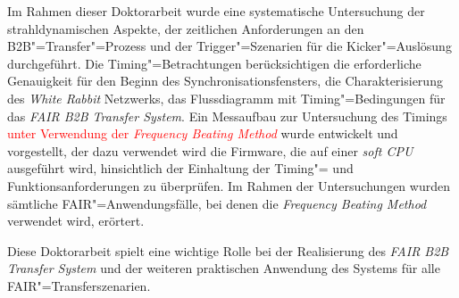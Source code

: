 Im Rahmen dieser Doktorarbeit wurde eine systematische Untersuchung der strahldynamischen Aspekte, der zeitlichen Anforderungen an den B2B"=Transfer"=Prozess und der Trigger"=Szenarien f\"ur die Kicker"=Ausl\"osung durchgef\"uhrt. Die Timing"=Betrachtungen ber\"ucksichtigen die erforderliche Genauigkeit f\"ur den Beginn des Synchronisationsfensters, die Charakterisierung des \textit{White Rabbit} Netzwerks, das Flussdiagramm mit Timing"=Bedingungen f\"ur das \textit{FAIR B2B Transfer System}. Ein Messaufbau zur Untersuchung des Timings \textcolor{red}{unter Verwendung der \textit{Frequency Beating Method}} wurde entwickelt und vorgestellt, der dazu verwendet wird die Firmware, die auf einer \textit{soft CPU} ausgef\"uhrt wird, hinsichtlich der Einhaltung der Timing"= und Funktionsanforderungen zu \"uberpr\"ufen. Im Rahmen der Untersuchungen wurden s\"amtliche FAIR"=Anwendungsf\"alle, bei denen die \textit{Frequency Beating Method} verwendet wird, er\"ortert.

Diese Doktorarbeit spielt eine wichtige Rolle bei der Realisierung des \textit{FAIR B2B Transfer System} und der weiteren praktischen Anwendung des Systems f\"ur alle FAIR"=Transferszenarien.

